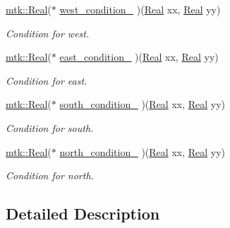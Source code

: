 \begin{DoxyCompactItemize}
\hyperlink{group__c01-roots_gac080bbbf5cbb5502c9f00405f894857d}{mtk\+::\+Real}($\ast$ \hyperlink{classmtk_1_1BCDescriptor2D_a98bfe7ea4256d0777a6b19d1701645db}{west\+\_\+condition\+\_\+} )(\hyperlink{group__c01-roots_gac080bbbf5cbb5502c9f00405f894857d}{Real} xx, \hyperlink{group__c01-roots_gac080bbbf5cbb5502c9f00405f894857d}{Real} yy)
\begin{DoxyCompactList}\small\item\em Condition for west. \end{DoxyCompactList}\item 
\hyperlink{group__c01-roots_gac080bbbf5cbb5502c9f00405f894857d}{mtk\+::\+Real}($\ast$ \hyperlink{classmtk_1_1BCDescriptor2D_ad63ffb74a62474e753e135324e6462d0}{east\+\_\+condition\+\_\+} )(\hyperlink{group__c01-roots_gac080bbbf5cbb5502c9f00405f894857d}{Real} xx, \hyperlink{group__c01-roots_gac080bbbf5cbb5502c9f00405f894857d}{Real} yy)
\begin{DoxyCompactList}\small\item\em Condition for east. \end{DoxyCompactList}\item 
\hyperlink{group__c01-roots_gac080bbbf5cbb5502c9f00405f894857d}{mtk\+::\+Real}($\ast$ \hyperlink{classmtk_1_1BCDescriptor2D_ae4e7cdb5e7007c5ab09b6c0efb329943}{south\+\_\+condition\+\_\+} )(\hyperlink{group__c01-roots_gac080bbbf5cbb5502c9f00405f894857d}{Real} xx, \hyperlink{group__c01-roots_gac080bbbf5cbb5502c9f00405f894857d}{Real} yy)
\begin{DoxyCompactList}\small\item\em Condition for south. \end{DoxyCompactList}\item 
\hyperlink{group__c01-roots_gac080bbbf5cbb5502c9f00405f894857d}{mtk\+::\+Real}($\ast$ \hyperlink{classmtk_1_1BCDescriptor2D_af3ecae6fedd3f3422e62b247ef5fea42}{north\+\_\+condition\+\_\+} )(\hyperlink{group__c01-roots_gac080bbbf5cbb5502c9f00405f894857d}{Real} xx, \hyperlink{group__c01-roots_gac080bbbf5cbb5502c9f00405f894857d}{Real} yy)
\begin{DoxyCompactList}\small\item\em Condition for north. \end{DoxyCompactList}\end{DoxyCompactItemize}


\subsection{Detailed Description}


